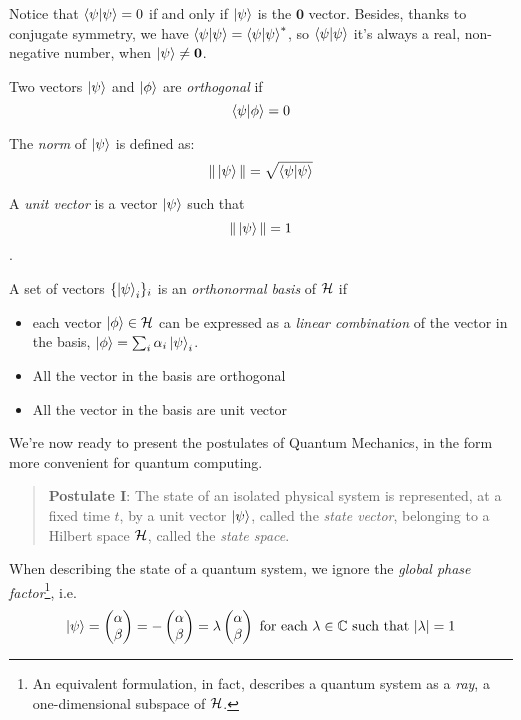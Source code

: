 Notice that $\braket{\psi|\psi} = 0$ if and only if $\ket{\psi}$ is the $\mathbf{0}$ vector. Besides, thanks to conjugate symmetry, we have $\braket{\psi | \psi} = \braket{\psi | \psi} ^ *$, so $\braket{\psi | \psi}$ it's always a real, non-negative number, when $\ket{\psi} \neq \mathbf{0}$.

Two vectors $\ket{\psi}$ and $\ket{\phi}$ are \textit{orthogonal} if
 \[\braket{\psi | \phi} = 0\]


The \textit{norm} of $\ket{\psi}$ is defined as: 
\[ \|\ket{\psi}\| = \sqrt{\braket{\psi|\psi}}\]


A \textit{unit vector} is a vector $\ket{\psi}$ such that \[\|\ket{\psi}\| = 1\].

A set of vectors $\{\ket{\psi}_i\}_i$ is an \textit{orthonormal basis} of $\mathcal{H}$ if \begin{itemize}
	\item each vector $\ket{\phi} \in \mathcal{H}$ can be expressed as a \textit{linear combination} of the vector in the basis, $\ket{\phi} = \sum_i \alpha_i\ket{\psi}_i$.
	\item All the vector in the basis are orthogonal
	\item All the vector in the basis are unit vector 
\end{itemize}

We're now ready to present the postulates of Quantum Mechanics, in the form more convenient for quantum computing.

\begin{quote} 
\textbf{Postulate I}: The state of an isolated physical system is represented, at a fixed time $t$, by a unit vector $\ket{\psi}$, called the \textit{state vector}, belonging to a Hilbert space $\mathcal{H}$, called the \textit{state space}. 
\end{quote}

 When describing the state of a quantum system, we ignore the \textit{global phase factor}\footnote{An equivalent formulation, in fact, describes a quantum system as a \textit{ray}, a one-dimensional subspace of $\mathcal{H}$.}, i.e. 
 \[
 	\ket{\psi} = \begin{pmatrix}
	\alpha \\
	\beta
	\end{pmatrix} = - \begin{pmatrix}
	\alpha \\
	\beta
	\end{pmatrix} = \lambda \begin{pmatrix}
	\alpha \\
	\beta
	\end{pmatrix} 
	\text{ for each $\lambda \in \mathbb{C}$  such that $|\lambda| = 1$}
 \]

